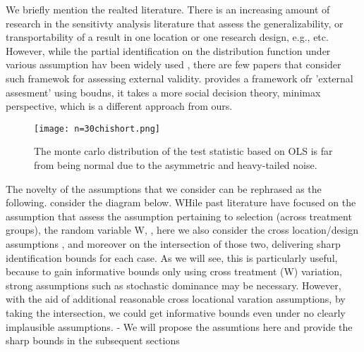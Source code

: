 \documentclass{article}
\begin{document}
 We briefly mention the realted literature. There is an increasing amount of research in the sensitivty analysis literature that assess the generalizability, or transportability of a result in one location or one research design, e.g., \cite{imai egami, } etc. However, while the partial identification on the distribution function under various assumption hav been widely used \cite{blundell et al, manski 200 3, manski horo}, there are few papers that consider such framewok for assessing external validity. \cite{manski 2013} provides a framework ofr  'external assesment' using boudns, it takes a more social decision theory, minimax perspective, which is a different approach from ours. 
\begin{en-text}
\begin{figure}
    \centering
    \texttt{[image: n=30chishort.png]}
    \caption{The monte carlo distribution of the test statistic based on OLS is far from being normal due to the asymmetric and heavy-tailed noise.}
    \label{fig:demonstration}
\end{figure}

\end{en-text}
 The novelty of the assumptions that we consider can be rephrased as the following. consider the diagram below. WHile past literature have focused on the assumption that assess the assumption pertaining to selection (across treatment groups), the random variable W, \cite{blundell et al}, here we also consider the cross location/design assumptions , and moreover on the intersection of those two, delivering sharp identification bounds for each case. As we will see, this is particularly useful, because to gain informative bounds only using cross treatment (W) variation, strong assumptions such as stochastic dominance may be necessary. However, with the aid of additional reasonable cross locational varation assumptions, by taking the intersection, we could get informative bounds even under no clearly implausible assumptions. 
- We will propose the assumtions here and provide the sharp bounds in the subsequent sections
\end{document}
